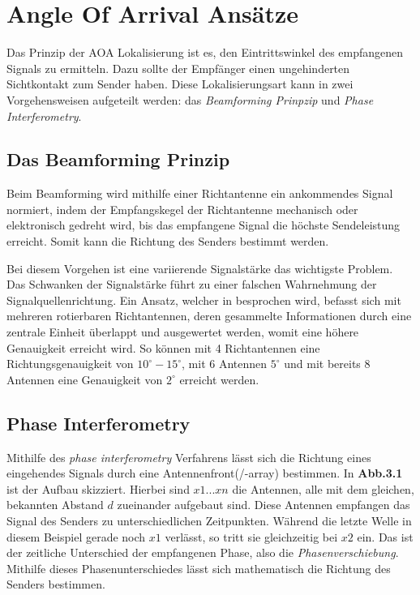 \documentclass[12pt, a4wide]{scrreprt}
\begin{document}
    \section{Angle Of Arrival Ansätze}
Das Prinzip der \acs{AOA} Lokalisierung ist es, den Eintrittswinkel des empfangenen Signals zu ermitteln. Dazu sollte der Empfänger einen ungehinderten Sichtkontakt zum Sender haben. Diese Lokalisierungsart kann in zwei Vorgehensweisen aufgeteilt werden: das \textit{Beamforming Prinpzip} und \textit{Phase Interferometry}.  
    \subsection{Das Beamforming Prinzip}
Beim Beamforming wird mithilfe einer Richtantenne ein ankommendes Signal normiert, indem der Empfangskegel der Richtantenne mechanisch oder elektronisch gedreht wird, bis das empfangene Signal die höchste Sendeleistung erreicht. Somit kann die Richtung des Senders bestimmt werden. 

Bei diesem Vorgehen ist eine variierende Signalstärke das wichtigste Problem. Das Schwanken der Signalstärke führt zu einer falschen Wahrnehmung der Signalquellenrichtung. Ein Ansatz, welcher in \cite{q1} besprochen wird, befasst sich mit mehreren rotierbaren Richtantennen, deren gesammelte Informationen durch eine zentrale Einheit überlappt und ausgewertet werden, womit eine höhere Genauigkeit erreicht wird. So können mit 4 Richtantennen eine Richtungsgenauigkeit von $10^\circ -15^\circ$, mit 6 Antennen $5^\circ$ und mit bereits 8 Antennen eine Genauigkeit von $2^\circ$ erreicht werden\cite{q1}.
    \subsection{Phase Interferometry}
Mithilfe des \textit{phase interferometry}\cite{q1} Verfahrens lässt sich die Richtung eines eingehendes Signals durch eine Antennenfront(/-array) bestimmen. In {\bf Abb.3.1} ist der Aufbau skizziert. Hierbei sind $x1...xn$ die Antennen, alle mit dem gleichen, bekannten Abstand $d$ zueinander aufgebaut sind. Diese Antennen empfangen das Signal des Senders zu unterschiedlichen Zeitpunkten. Während die letzte Welle in diesem Beispiel gerade noch $x1$ verlässt, so tritt sie gleichzeitig bei $x2$ ein. Das ist der zeitliche Unterschied der empfangenen Phase, also die \textit{Phasenverschiebung}. Mithilfe dieses Phasenunterschiedes lässt sich mathematisch die Richtung des Senders bestimmen.\\
\end{document}
